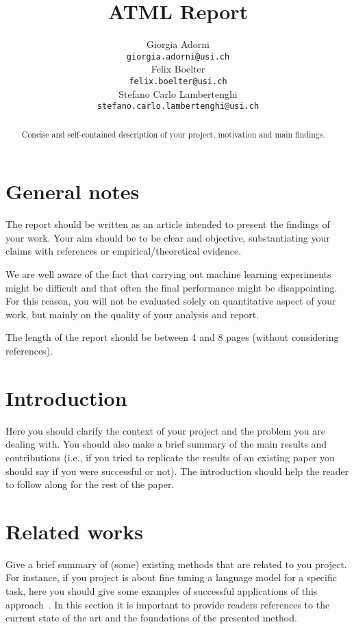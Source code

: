 \documentclass{article}
\title{ATML Report}
\author{%
	Giorgia Adorni \\
		\texttt{giorgia.adorni@usi.ch} \\
		\And
		Felix Boelter\\
		\texttt{felix.boelter@usi.ch}\\
		\And
		Stefano Carlo Lambertenghi\\
		\texttt{stefano.carlo.lambertenghi@usi.ch}\\
}
\begin{document}
	
	\maketitle
	
	\begin{abstract}
		Concise and self-contained description of your project, motivation and main findings.
	\end{abstract}
	
	\section*{General notes}
	
	The report should be written as an article intended to present the findings of your work. Your aim 
	should be to be clear and objective, substantiating your claims with references or 
	empirical/theoretical evidence.
	
	We are well aware of the fact that carrying out machine learning experiments might be difficult and 
	that often the final performance might be disappointing. For this reason, you will not be evaluated 
	solely on quantitative aspect of your work, but mainly on the quality of your analysis and report.
	
	The length of the report should be between 4 and 8 pages (without considering references).
	
	\section{Introduction}
	
	Here you should clarify the context of your project and the problem you are dealing with. You 
	should also make a brief summary of the main results and contributions (i.e., if you tried to replicate 
	the results of an existing paper you should say if you were successful or not). The introduction 
	should help the reader to follow along for the rest of the paper.
	
	\section{Related works}
	
	Give a brief summary of (some) existing methods that are related to you project. For instance, if you 
	project is about fine tuning a language model for a specific task, here you should give some 
	examples of successful applications of this approach~\cite{ziegler2020finetuning}. In this section it 
	is important to provide readers references to the current state of the art and the foundations of the 
	presented method. 
	
\end{document}
